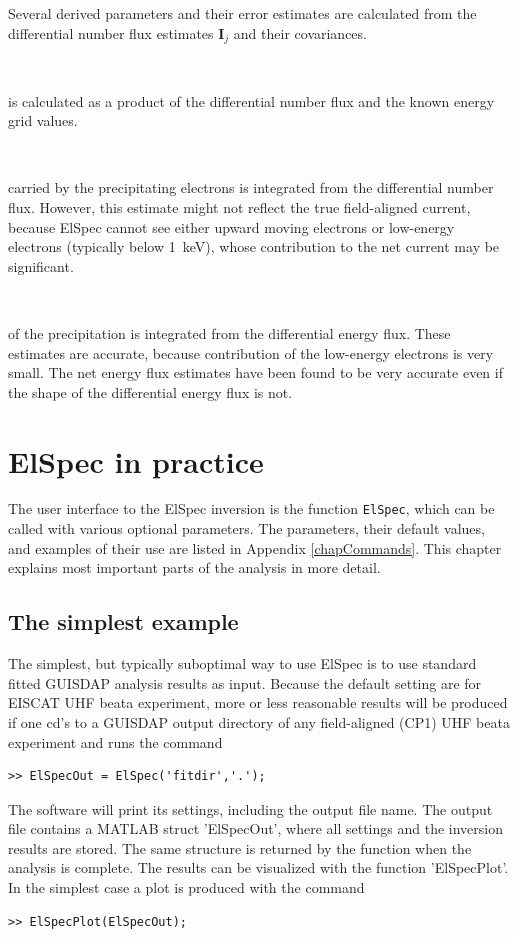 \documentclass[12pt,a4paper]{report}
\begin{document}
Several derived parameters and their error estimates are calculated from the differential number flux estimates $\bm{I}_j$ and their covariances. 

~

 is calculated as a product of the differential number flux and the known energy grid values. 

~

 carried by the precipitating electrons is integrated from the differential number flux. However, this estimate might not reflect the true field-aligned current, because ElSpec cannot see either upward moving electrons or low-energy electrons (typically below 1~keV), whose contribution to the net current may be significant.

~

 of the precipitation is integrated from the differential energy flux. These estimates are accurate, because contribution of the low-energy electrons is very small. The net energy flux estimates have been found to be very accurate even if the shape of the differential energy flux is not. 





\chapter{ElSpec in practice}

The user interface to the ElSpec inversion is the function \verb|ElSpec|, which can be called with various optional parameters. The parameters, their default values, and examples of their use are listed in Appendix \ref{chapCommands}. This chapter explains most important parts of the analysis in more detail. 


\section{The simplest example}

The simplest, but typically suboptimal way to use ElSpec is to use standard fitted GUISDAP analysis results as input. Because the default setting are for EISCAT UHF beata experiment, more or less reasonable results will be produced if one cd's to a GUISDAP output directory of any field-aligned (CP1) UHF beata experiment and runs the command
\begin{lstlisting}[style=myMATLAB]
>> ElSpecOut = ElSpec('fitdir','.');
\end{lstlisting}
The software will print its settings, including the output file name. The output file contains a MATLAB struct 'ElSpecOut', where all settings and the inversion results are stored. The same structure is returned by the function when the analysis is complete.  The results can be visualized with the function 'ElSpecPlot'. In the simplest case a plot is produced with the command
\begin{lstlisting}[style=myMATLAB]
>> ElSpecPlot(ElSpecOut);
\end{lstlisting}
\end{document}
